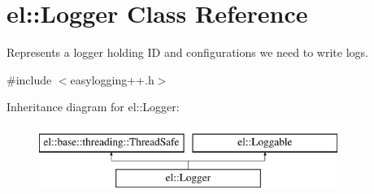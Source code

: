 \hypertarget{classel_1_1Logger}{\section{el\-:\-:Logger Class Reference}
\label{classel_1_1Logger}
}


Represents a logger holding I\-D and configurations we need to write logs.  




{\ttfamily \#include $<$easylogging++.\-h$>$}

Inheritance diagram for el\-:\-:Logger\-:\begin{figure}[H]
\begin{center}
\leavevmode
\includegraphics[height=2.000000cm]{classel_1_1Logger}
\end{center}
\end{figure}

